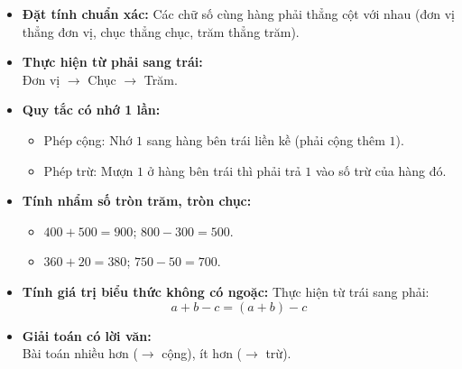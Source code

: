 \documentclass[10pt,a4paper]{article}
\begin{document}
\noindent
\begin{minipage}[t]{0.49\textwidth}\vspace{0pt}
\begin{tcolorbox}[
  enhanced,
  colback=violet!4!white,
  colframe=violet!75!black,
  arc=2mm, boxrule=0.8pt,
  left=2mm, right=2mm, top=1.8mm, bottom=1.8mm,
  title={\footnotesize\bfseries\color{white}\faKey\ 1. Khắc sâu kĩ thuật đặt tính và tính}
]
{\footnotesize
\begin{itemize}\setlength{\itemsep}{1pt}\setlength{\leftskip}{-2.5mm}
  \item \textbf{Đặt tính chuẩn xác:} Các chữ số cùng hàng phải thẳng cột với nhau (đơn vị thẳng đơn vị, chục thẳng chục, trăm thẳng trăm).
  \item \textbf{Thực hiện từ phải sang trái:}\\
  Đơn vị $\longrightarrow$ Chục $\longrightarrow$ Trăm.
  \item \textbf{Quy tắc có nhớ 1 lần:}
  \begin{itemize}\setlength{\itemsep}{0.5pt}\setlength{\leftskip}{-2mm}
    \item Phép cộng: Nhớ $1$ sang hàng bên trái liền kề (phải cộng thêm $1$).
    \item Phép trừ: Mượn $1$ ở hàng bên trái thì phải trả $1$ vào số trừ của hàng đó.
  \end{itemize}
\end{itemize}
}
\end{tcolorbox}
\end{minipage}
\hfill
\begin{minipage}[t]{0.49\textwidth}\vspace{0pt}
\begin{tcolorbox}[
  enhanced,
  colback=teal!4!white,
  colframe=teal!75!black,
  arc=2mm, boxrule=0.8pt,
  left=2mm, right=2mm, top=1.8mm, bottom=1.8mm,
  title={\footnotesize\bfseries\color{white}\faSliders\ 2. Kĩ năng tính nhẩm và giải toán}
]
{\footnotesize
\begin{itemize}\setlength{\itemsep}{1pt}\setlength{\leftskip}{-2.5mm}
  \item \textbf{Tính nhẩm số tròn trăm, tròn chục:}
  \begin{itemize}\setlength{\itemsep}{0.5pt}\setlength{\leftskip}{-2mm}
    \item $400 + 500 = 900$; \quad $800 - 300 = 500$.
    \item $360 + 20 = 380$; \quad $750 - 50 = 700$.
  \end{itemize}
  \item \textbf{Tính giá trị biểu thức không có ngoặc:} Thực hiện từ trái sang phải:
  $$a + b - c = (a + b) - c$$
  \item \textbf{Giải toán có lời văn:}\\
  Bài toán nhiều hơn ($\to$ cộng), ít hơn ($\to$ trừ).
\end{itemize}
}
\end{tcolorbox}
\end{minipage}
\end{document}

